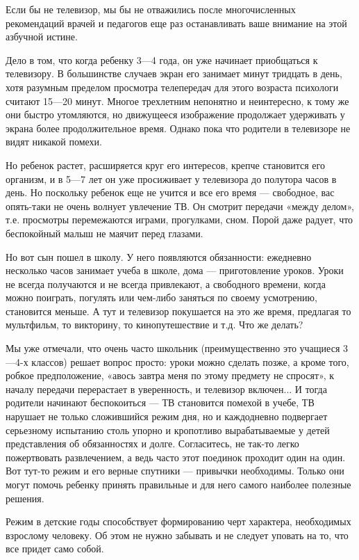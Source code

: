 \documentclass[12pt, a4paper, openany]{book}
\begin{document}
Если бы не телевизор, мы бы не отважились после многочисленных рекомендаций врачей и педагогов еще раз останавливать ваше внимание на этой азбучной истине. 

Дело в том, что когда ребенку 3—4 года, он уже начинает приобщаться к телевизору. В большинстве случаев экран его занимает минут тридцать в день, хотя разумным пределом просмотра телепередач для этого возраста психологи считают 15—20 минут. Многое трехлетним непонятно и неинтересно, к тому же они быстро утомляются, но движущееся изображение продолжает удерживать у экрана более продолжительное время. Однако пока что родители в телевизоре не видят никакой помехи. 

Но ребенок растет, расширяется круг его интересов, крепче становится его организм, и в 5—7 лет он уже просиживает у телевизора до полутора часов в день. Но поскольку ребенок еще не учится и все его время — свободное, вас опять-таки не очень волнует увлечение ТВ. Он смотрит передачи «между делом», т.е. просмотры перемежаются играми, прогулками, сном. Порой даже радует, что беспокойный малыш не маячит перед глазами. 

Но вот сын пошел в школу. У него появляются обязанности: ежедневно несколько часов занимает учеба в школе, дома — приготовление уроков. Уроки не всегда получаются и не всегда привлекают, а свободного времени, когда можно поиграть, погулять или чем-либо заняться по своему усмотрению, становится меньше. А тут и телевизор покушается на это же время, предлагая то мультфильм, то викторину, то кинопутешествие и т.д. Что же делать? 

Мы уже отмечали, что очень часто школьник (преимущественно это учащиеся 3—4-х классов) решает вопрос просто: уроки можно сделать позже, а кроме того, робкое предположение, «авось завтра меня по этому предмету не спросят», к началу передачи перерастает в уверенность, и телевизор включен... И тогда родители начинают беспокоиться — ТВ становится помехой в учебе, ТВ нарушает не только сложившийся режим дня, но и каждодневно подвергает серьезному испытанию столь упорно и кропотливо вырабатываемые у детей представления об обязанностях и долге. Согласитесь, не так-то легко пожертвовать развлечением, а ведь часто этот поединок проходит один на один. Вот тут-то режим и его верные спутники — привычки необходимы. Только они могут помочь ребенку принять правильные и для него самого наиболее полезные решения. 

Режим в детские годы способствует формированию черт характера, необходимых взрослому человеку. Об этом не нужно забывать и не следует уповать на то, что все придет само собой. 
\end{document}
